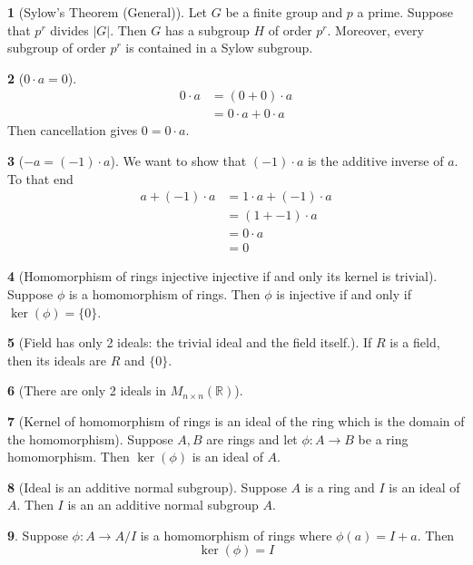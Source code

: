 \documentclass[12pt]{article}
\theoremstyle{definition}
\newtheorem{theorem}{\color{ForestGreen}{\textbf{Theorem}}}
\newcommand{\R}{\mathbb{R}}
\begin{document}
\begin{theorem}[Sylow's Theorem (General)]
Let $G$ be a finite group and $p$ a prime. Suppose that $p^r$ divides $|G|$. Then $G$ has a subgroup $H$ of order $p^r$. Moreover, every subgroup of order $p^r$ is contained in a Sylow subgroup.
\end{theorem}

\begin{theorem}[$0\cdot a = 0$]
\begin{align*}
0 \cdot a &= (0 + 0) \cdot a \tag{$0$ additive identity}\\
&= 0\cdot a + 0 \cdot a \tag{distributivity}
\end{align*}
Then cancellation gives $0 = 0 \cdot a$.
\end{theorem}

\begin{theorem}[$-a = (-1)\cdot a$]
We want to show that $(-1)\cdot a$ is the additive inverse of $a$. To that end
\begin{align*}
a + (-1)\cdot a &= 1 \cdot a + (-1) \cdot a \tag{$1$ multiplicative identity}\\
&= (1 + -1) \cdot a \tag{distributivity}\\
&= 0 \cdot a \\
&= 0
\end{align*}
\end{theorem}

\begin{theorem}[Homomorphism of rings injective injective if and only its kernel is trivial]
Suppose $\phi$ is a homomorphism of rings. Then $\phi$ is injective if and only if $\ker(\phi) = \{0\}$.
\end{theorem}

\begin{theorem}[Field has only 2 ideals: the trivial ideal and the field itself.]
If $R$ is a field, then its ideals are $R$ and $\{0\}$.
\end{theorem}

\begin{theorem}[There are only 2 ideals in $M_{n\times n}(\R)$]
\end{theorem}

\begin{theorem}[Kernel of homomorphism of rings is an ideal of the ring which is the domain of the homomorphism]
Suppose $A,B$ are rings and let $\phi:A \to B$ be a ring homomorphism. Then $\ker(\phi)$ is an ideal of $A$.
\end{theorem}

\begin{theorem}[Ideal is an additive normal subgroup]
Suppose $A$ is a ring and $I$ is an ideal of $A$. Then $I$ is an an additive normal subgroup $A$.
\end{theorem}

\begin{theorem}
Suppose $\phi : A \to A/I$ is a homomorphism of rings where $\phi(a) = I + a$. Then
\begin{equation}
\ker(\phi) = I
\end{equation}
\end{theorem}
\end{document}
